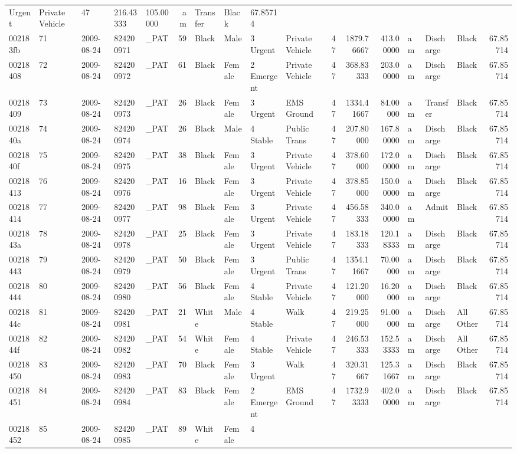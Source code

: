 \documentclass[]{elsarticle} %
\begin{document}
\begin{longtable}[]{@{}lllllrllllrrrlllr@{}}
Urgent & Private Vehicle & 47 & 216.43333 & 105.00000 & am & Transfer &
Black & 67.85714\tabularnewline
002183fb & 71 & 2009-08-24 & 824200971 & \_PAT & 59 & Black & Male & 3
Urgent & Private Vehicle & 47 & 1879.76667 & 413.00000 & am & Discharge
& Black & 67.85714\tabularnewline
00218408 & 72 & 2009-08-24 & 824200972 & \_PAT & 61 & Black & Female & 2
Emergent & Private Vehicle & 47 & 368.83333 & 203.00000 & am & Discharge
& Black & 67.85714\tabularnewline
00218409 & 73 & 2009-08-24 & 824200973 & \_PAT & 26 & Black & Female & 3
Urgent & EMS Ground & 47 & 1334.41667 & 84.00000 & am & Transfer & Black
& 67.85714\tabularnewline
0021840a & 74 & 2009-08-24 & 824200974 & \_PAT & 26 & Black & Male & 4
Stable & Public Trans & 47 & 207.80000 & 167.80000 & am & Discharge &
Black & 67.85714\tabularnewline
0021840f & 75 & 2009-08-24 & 824200975 & \_PAT & 38 & Black & Female & 3
Urgent & Private Vehicle & 47 & 378.60000 & 172.00000 & am & Discharge &
Black & 67.85714\tabularnewline
00218413 & 76 & 2009-08-24 & 824200976 & \_PAT & 16 & Black & Female & 3
Urgent & Private Vehicle & 47 & 378.85000 & 150.00000 & am & Discharge &
Black & 67.85714\tabularnewline
00218414 & 77 & 2009-08-24 & 824200977 & \_PAT & 98 & Black & Female & 3
Urgent & Private Vehicle & 47 & 456.58333 & 340.00000 & am & Admit &
Black & 67.85714\tabularnewline
0021843a & 78 & 2009-08-24 & 824200978 & \_PAT & 25 & Black & Female & 3
Urgent & Private Vehicle & 47 & 183.18333 & 120.18333 & am & Discharge &
Black & 67.85714\tabularnewline
00218443 & 79 & 2009-08-24 & 824200979 & \_PAT & 50 & Black & Female & 3
Urgent & Public Trans & 47 & 1354.11667 & 70.00000 & am & Discharge &
Black & 67.85714\tabularnewline
00218444 & 80 & 2009-08-24 & 824200980 & \_PAT & 56 & Black & Female & 4
Stable & Private Vehicle & 47 & 121.20000 & 16.20000 & am & Discharge &
Black & 67.85714\tabularnewline
0021844c & 81 & 2009-08-24 & 824200981 & \_PAT & 21 & White & Male & 4
Stable & Walk & 47 & 219.25000 & 91.00000 & am & Discharge & All Other &
67.85714\tabularnewline
0021844f & 82 & 2009-08-24 & 824200982 & \_PAT & 54 & White & Female & 4
Stable & Private Vehicle & 47 & 246.53333 & 152.53333 & am & Discharge &
All Other & 67.85714\tabularnewline
00218450 & 83 & 2009-08-24 & 824200983 & \_PAT & 70 & Black & Female & 3
Urgent & Walk & 47 & 320.31667 & 125.31667 & am & Discharge & Black &
67.85714\tabularnewline
00218451 & 84 & 2009-08-24 & 824200984 & \_PAT & 83 & Black & Female & 2
Emergent & EMS Ground & 47 & 1732.93333 & 402.00000 & am & Discharge &
Black & 67.85714\tabularnewline
00218452 & 85 & 2009-08-24 & 824200985 & \_PAT & 89 & White & Female & 4

\end{longtable}
\end{document}
